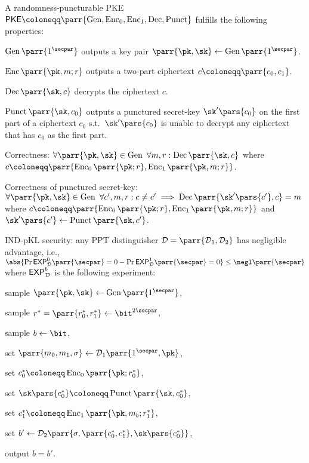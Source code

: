 A randomness-puncturable PKE \(\mathsf{PKE} \coloneqq \parr{\Gen, \Enc_0, \Enc_1, \Dec, \Punct}\) fulfills the following properties:
\begin{sitemize}
    \item \(\Gen\parr{1^\secpar}\) outputs a key pair \(\parr{\pk,\sk} \gets \Gen\parr{1^\secpar}\).
    \item \(\Enc\parr{\pk,m;r}\) outputs a two-part ciphertext \(c \coloneqq \parr{c_0,c_1}\).
    \item \(\Dec\parr{\sk,c}\) decrypts the ciphertext \(c\).
    \item \(\Punct\parr{\sk,c_0}\) outputs a punctured secret-key \(\sk'\pars{c_0}\) on the first part of a ciphertext \(c_0\) s.t.\ \(\sk'\pars{c_0}\) is unable to decrypt any ciphertext that has \(c_0\) as the first part.
    \item Correctness:
    \(\forall \parr{\pk,\sk} \in \Gen\ \forall m,r : \Dec\parr{\sk,c}\) where \(c \coloneqq \parr{\Enc_0\parr{\pk;r},\Enc_1\parr{\pk,m;r}}\).
    \item Correctness of punctured secret-key:
    \(\forall \parr{\pk,\sk} \in \Gen\ \forall c',m,r : c \neq c' \implies \Dec\parr{\sk'\pars{c'},c} = m\) where \(c \coloneqq \parr{\Enc_0\parr{\pk;r},\Enc_1\parr{\pk,m;r}}\) and \(\sk'\pars{c'} \gets \Punct\parr{\sk,c'}\).
    \item IND-pKL security:
    any PPT distinguisher \(\D = \parr{\D_1,\D_2}\) has negligible advantage, i.e., \(\abs{\Pr{\mathsf{EXP}^0_\D\parr{\secpar} = 0} - \Pr{\mathsf{EXP}^1_\D\parr{\secpar} = 0}} \leq \negl\parr{\secpar}\) where \(\mathsf{EXP}^b_{\mathcal{D}}\) is the following experiment:
    \begin{sitemize}
        \item sample \(\parr{\pk,\sk} \gets \Gen\parr{1^\secpar}\),
        \item sample \(r^* = \parr{r^*_0,r^*_1} \gets \bit^{2\secpar}\),
        \item sample \(b \gets \bit\),
        \item set \(\parr{m_0,m_1,\sigma} \gets \D_1\parr{1^\secpar,\pk}\),
        \item set \(c_0^* \coloneqq \Enc_0\parr{\pk;r^*_0}\),
        \item set \(\sk\pars{c^*_0} \coloneqq \Punct\parr{\sk,c_0^*}\),
        \item set \(c_1^* \coloneqq \Enc_1\parr{\pk,m_b;r^*_1}\),
        \item set \(b' \gets \D_2\parr{\sigma,\parr{c^*_0,c^*_1},\sk\pars{c^*_0}}\),
        \item output \(b = b'\).
    \end{sitemize}
\end{sitemize}

